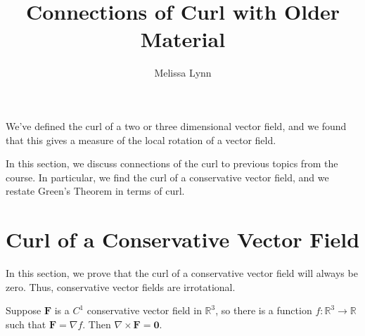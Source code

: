 \documentclass{ximera}
\title{Connections of Curl with Older Material}
\author{Melissa Lynn}
\begin{document}
  
\begin{abstract}  
\end{abstract}  
\maketitle 

We've defined the curl of a two or three dimensional vector field, and we found that this gives a measure of the local rotation of a vector field.

In this section, we discuss connections of the curl to previous topics from the course. In particular, we find the curl of a conservative vector field, and we restate Green's Theorem in terms of curl.

\section*{Curl of a Conservative Vector Field}

In this section, we prove that the curl of a conservative vector field will always be zero. Thus, conservative vector fields are irrotational.

\begin{theorem}
Suppose $\mathbf{F}$ is a $C^1$ conservative vector field in $\mathbb{R}^3$, so there is a function $f:\mathbb{R}^3\rightarrow\mathbb{R}$ such that $\mathbf{F}=\nabla f$. Then $\nabla\times\mathbf{F} = \mathbf{0}$.
\end{theorem}
\end{document}
